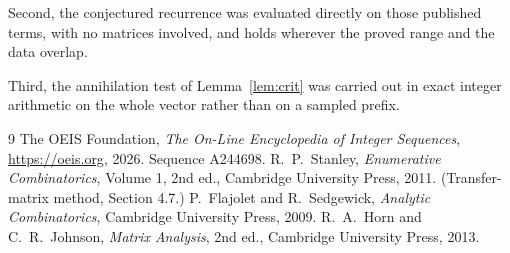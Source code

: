 \documentclass[11pt,a4paper]{article}
\theoremstyle{plain}
\theoremstyle{definition}
\begin{document}
Second, the conjectured recurrence was evaluated directly on those published terms, with no
matrices involved, and holds wherever the proved range and the data overlap.

Third, the annihilation test of Lemma~\ref{lem:crit} was carried out in exact integer
arithmetic on the whole vector rather than on a sampled prefix.

\begin{thebibliography}{9}
 The OEIS Foundation, \emph{The On-Line Encyclopedia of Integer
Sequences}, \url{https://oeis.org}, 2026. Sequence A244698.
 R.~P.~Stanley, \emph{Enumerative Combinatorics}, Volume 1, 2nd ed.,
Cambridge University Press, 2011. (Transfer-matrix method, Section 4.7.)
 P.~Flajolet and R.~Sedgewick, \emph{Analytic Combinatorics}, Cambridge
University Press, 2009.
 R.~A.~Horn and C.~R.~Johnson, \emph{Matrix Analysis}, 2nd ed., Cambridge
University Press, 2013.
\end{thebibliography}
\end{document}
